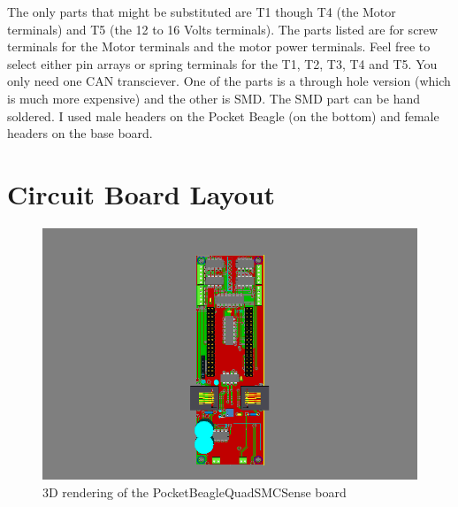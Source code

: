 The only parts that might be substituted are T1 though T4 (the Motor
terminals) and T5 (the 12 to 16 Volts terminals). The parts listed are for
screw terminals for the Motor terminals and the motor power terminals. Feel
free to select either pin arrays or spring terminals for the T1, T2, T3, T4
and T5.  You only need one CAN transciever.  One of the parts is a through 
hole version (which is much more expensive) and the other is SMD.  The SMD 
part can be hand soldered.  I used male headers on the Pocket Beagle (on the 
bottom) and female headers on the base board.

\section{Circuit Board Layout}

\begin{figure}[hbpt]\begin{centering}%
\includegraphics[width=5in]{PocketBeagleQuadSMCSense3DTop.png}
\caption{3D rendering of the PocketBeagleQuadSMCSense board}
\end{centering}\end{figure}
